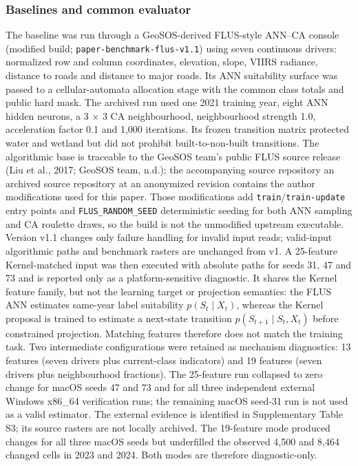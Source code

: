 \subsubsection{Baselines and common
evaluator}\label{baselines-and-common-evaluator}

The baseline was run through a GeoSOS-derived FLUS-style ANN--CA console
(modified build; \texttt{paper-benchmark-flus-v1.1}) using seven
continuous drivers: normalized row and column coordinates, elevation,
slope, VIIRS radiance, distance to roads and distance to major roads.
Its ANN suitability surface was passed to a cellular-automata allocation
stage with the common class totals and public hard mask. The archived
run used one 2021 training year, eight ANN hidden neurons, a 3 × 3 CA
neighbourhood, neighbourhood strength 1.0, acceleration factor 0.1 and
1,000 iterations. Its frozen transition matrix protected water and
wetland but did not prohibit built-to-non-built transitions. The
algorithmic base is traceable to the GeoSOS team's public FLUS source
release (Liu et al., 2017; GeoSOS team, n.d.); the accompanying source
repository an archived source repository at an anonymized revision
contains the author modifications used for this paper. Those
modifications add \texttt{train}/\texttt{train-update} entry points and
\texttt{FLUS\_RANDOM\_SEED} deterministic seeding for both ANN sampling
and CA roulette draws, so the build is not the unmodified upstream
executable. Version v1.1 changes only failure handling for invalid input
reads; valid-input algorithmic paths and benchmark rasters are unchanged
from v1. A 25-feature Kernel-matched input was then executed with
absolute paths for seeds 31, 47 and 73 and is reported only as a
platform-sensitive diagnostic. It shares the Kernel feature family, but
not the learning target or projection semantics: the FLUS ANN estimates
same-year label suitability \(p(S_t\mid X_t)\), whereas the Kernel
proposal is trained to estimate a next-state transition
\(p(S_{t+1}\mid S_t,X_t)\) before constrained projection. Matching
features therefore does not match the training task. Two intermediate
configurations were retained as mechanism diagnostics: 13 features
(seven drivers plus current-class indicators) and 19 features (seven
drivers plus neighbourhood fractions). The 25-feature run collapsed to
zero change for macOS seeds 47 and 73 and for all three independent
external Windows x86\_64 verification runs; the remaining macOS seed-31
run is not used as a valid estimator. The external evidence is
identified in Supplementary Table S3; its source rasters are not locally
archived. The 19-feature mode produced changes for all three macOS seeds
but underfilled the observed 4,500 and 8,464 changed cells in 2023 and
2024. Both modes are therefore diagnostic-only.

